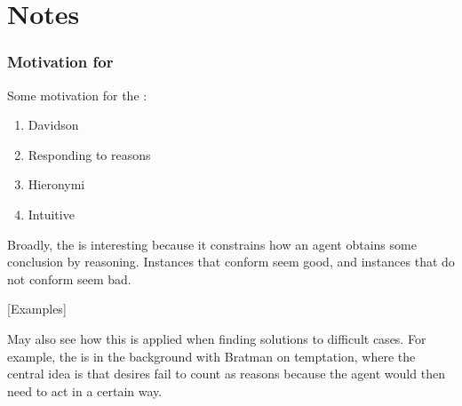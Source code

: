 
\chapter{Notes}
\label{cha:notes}

\subsection{Motivation for \ESU{}}
\label{sec:motiv-main-prem}

Some motivation for the \ESU{}:

\begin{enumerate}
\item Davidson
\item Responding to reasons
\item Hieronymi
\item Intuitive
\end{enumerate}

Broadly, the \ESU{} is interesting because it constrains how an agent obtains some conclusion by reasoning.
Instances that conform seem good, and instances that do not conform seem bad.

[Examples]

May also see how this is applied when finding solutions to difficult cases.
For example, the \ESU{} is in the background with Bratman on temptation, where the central idea is that desires fail to count as reasons because the agent would then need to act in a certain way.